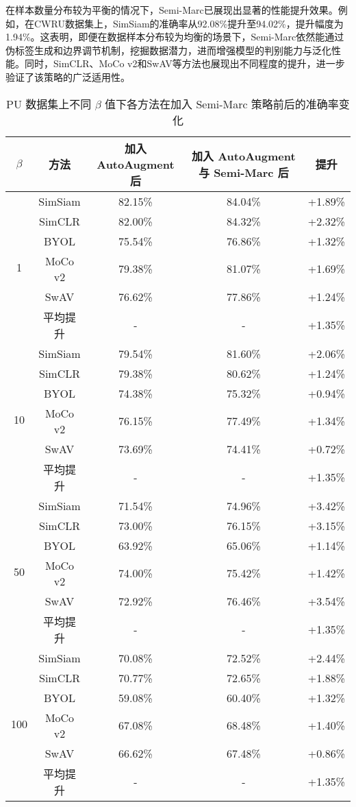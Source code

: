 \documentclass[master]{thesis-uestc}
\begin{document}
在样本数量分布较为平衡的情况下，Semi-Marc已展现出显著的性能提升效果。例如，在CWRU数据集上，SimSiam的准确率从92.08\%提升至94.02\%，提升幅度为1.94\%。这表明，即便在数据样本分布较为均衡的场景下，Semi-Marc依然能通过伪标签生成和边界调节机制，挖掘数据潜力，进而增强模型的判别能力与泛化性能。同时，SimCLR、MoCo v2和SwAV等方法也展现出不同程度的提升，进一步验证了该策略的广泛适用性。

\begin{table}[!h]
    \caption{PU 数据集上不同 $\beta$ 值下各方法在加入 Semi-Marc 策略前后的准确率变化}
    \centering
    \renewcommand\arraystretch{1.2}
    \begin{tabular}{ccccc}
    \toprule
    $\beta$ & 方法 & 加入 AutoAugment 后 & 加入 AutoAugment 与 Semi-Marc 后 & 提升 \\
    \midrule
    \multirow{6}{*}{1}   
        & SimSiam & 82.15\% & 84.04\% & +1.89\% \\
        & SimCLR  & 82.00\% & 84.32\% & +2.32\% \\
        & BYOL    & 75.54\% & 76.86\% & +1.32\% \\
        & MoCo v2 & 79.38\% & 81.07\% & +1.69\% \\
        & SwAV    & 76.62\% & 77.86\% & +1.24\% \\
        & 平均提升    & - & - & +1.35\% \\
    \midrule
    \multirow{6}{*}{10}  
        & SimSiam & 79.54\% & 81.60\% & +2.06\% \\
        & SimCLR  & 79.38\% & 80.62\% & +1.24\% \\
        & BYOL    & 74.38\% & 75.32\% & +0.94\% \\
        & MoCo v2 & 76.15\% & 77.49\% & +1.34\% \\
        & SwAV    & 73.69\% & 74.41\% & +0.72\% \\
        & 平均提升    & - & - & +1.35\% \\
    \midrule
    \multirow{6}{*}{50}  
        & SimSiam & 71.54\% & 74.96\% & +3.42\% \\
        & SimCLR  & 73.00\% & 76.15\% & +3.15\% \\
        & BYOL    & 63.92\% & 65.06\% & +1.14\% \\
        & MoCo v2 & 74.00\% & 75.42\% & +1.42\% \\
        & SwAV    & 72.92\% & 76.46\% & +3.54\% \\
        & 平均提升    & - & - & +1.35\% \\
    \midrule
    \multirow{6}{*}{100} 
        & SimSiam & 70.08\% & 72.52\% & +2.44\% \\
        & SimCLR  & 70.77\% & 72.65\% & +1.88\% \\
        & BYOL    & 59.08\% & 60.40\% & +1.32\% \\
        & MoCo v2 & 67.08\% & 68.48\% & +1.40\% \\
        & SwAV    & 66.62\% & 67.48\% & +0.86\% \\
        & 平均提升    & - & - & +1.35\% \\
    \bottomrule
    \end{tabular}
    \label{tab:longtail_Semi-Marc_comparison_pu}
\end{table}
\end{document}
